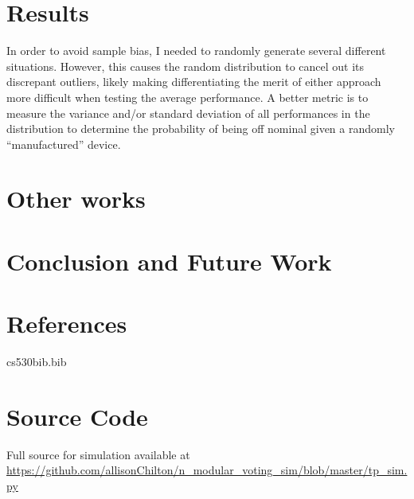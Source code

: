 \documentclass[article]{IEEEtran}
\begin{document}
\section{Results}
In order to avoid sample bias, I needed to randomly generate several different situations. However, this causes the random distribution to cancel out its discrepant outliers, likely making differentiating the merit of either approach more difficult when testing the average performance. A better metric is to measure the variance and/or standard deviation of all performances in the distribution to determine the probability of being off nominal given a randomly “manufactured” device.




\section{Other works}
\section{Conclusion and Future Work}
\section{References}

\begin{filecontents}[overwrite]{cs530bib.bib}


\end{filecontents}

%
\appendix
\section{Source Code}
Full source for simulation available at \url{ https://github.com/allisonChilton/n_modular_voting_sim/blob/master/tp_sim.py}
\end{document}
